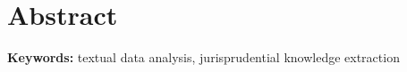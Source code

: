 \chapter*{Abstract}

\textbf{Keywords:} textual data analysis, jurisprudential knowledge extraction 



